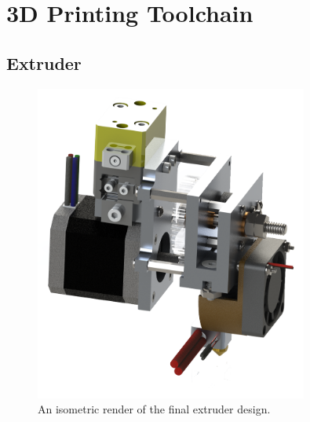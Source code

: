 \section{3D Printing Toolchain}

\subsection{Extruder}

\indent

\begin{figure}[htp]
\centering
\includegraphics[width=0.8\textwidth]{./figures/extruder-iso}
\caption{An isometric render of the final extruder design.}
\label{fig:flowchart}
\end{figure}

